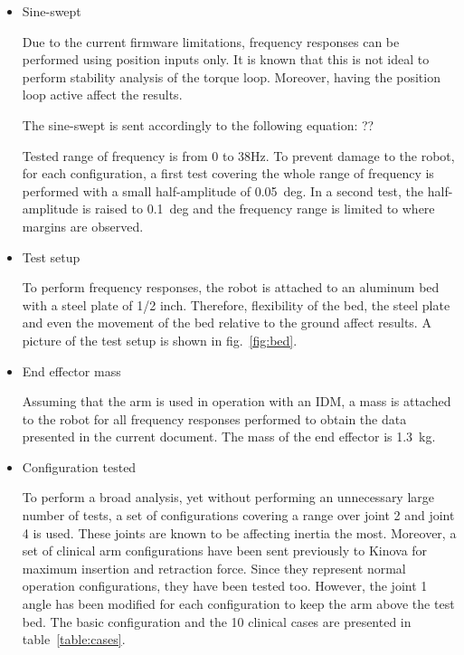 \begin{itemize}
	\item Sine-swept
	
	Due to the current firmware limitations, frequency responses can be performed using position inputs only. It is known that this is not ideal to perform stability analysis of the torque loop. Moreover, having the position loop active affect the results.
	
	The sine-swept is sent accordingly to the following equation: ??
	
	Tested range of frequency is from 0 to 38Hz. To prevent damage to the robot, for each configuration, a first test covering the whole range of frequency is performed with a small half-amplitude of 0.05~deg. In a second test, the half-amplitude is raised to 0.1~deg and the frequency range is limited to where margins are observed.
	
	\item Test setup
	
	To perform frequency responses, the robot is attached to an aluminum bed with a steel plate of 1/2 inch. Therefore, flexibility of the bed, the steel plate and even the movement of the bed relative to the ground affect results. A picture of the test setup is shown in fig.~\ref{fig:bed}.
	
	\item End effector mass
	
	Assuming that the arm is used in operation with an IDM, a mass is attached to the robot for all frequency responses performed to obtain the data presented in the current document. The mass of the end effector is 1.3~kg.
	
	\item Configuration tested
	
	To perform a broad analysis, yet without performing an unnecessary large number of tests, a set of configurations covering a range over joint 2 and joint 4 is used. These joints are known to be affecting inertia the most. Moreover, a set of clinical arm configurations have been sent previously to Kinova for maximum insertion and retraction force. Since they represent normal operation configurations, they have been tested too. However, the joint 1 angle has been modified for each configuration to keep the arm above the test bed. The basic configuration and the 10 clinical cases are presented in table~\ref{table:cases}.

	

\end{itemize}

